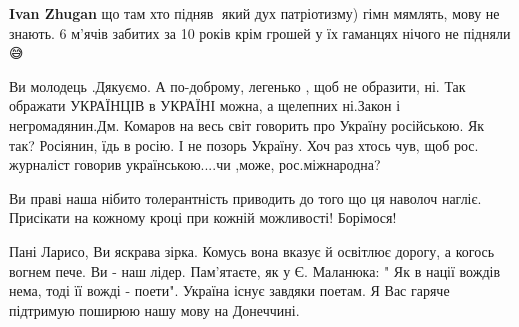 \begin{itemize}
\begin{itemize}
 
\textbf{Ivan Zhugan} що там хто підняв🤦 який дух патріотизму) гімн мямлять, мову не знають. 6 м'ячів забитих за 10 років крім грошей у їх гаманцях нічого не підняли😅
\end{itemize}

 

Ви молодець .Дякуємо. А по-доброму, легенько , щоб не образити, ні. Так
ображати УКРАЇНЦІВ в УКРАЇНІ можна, а щелепних ні.Закон і негромадянин.Дм.
Комаров на весь світ говорить про Україну російською. Як так? Росіянин, їдь в
росію. І не позорь Україну. Хоч раз хтось чув, щоб рос. журналіст говорив
українською....чи ,може, рос.міжнародна?


 

Ви праві наша нібито толерантність приводить до того що ця наволоч нагліє.
Присікати на кожному кроці при кожній можливості! Борімося!


 

Пані Ларисо, Ви яскрава зірка. Комусь вона вказує й освітлює дорогу, а когось
вогнем пече. Ви - наш лідер. Пам'ятаєте, як у Є. Маланюка: " Як в нації вождів
нема, тоді її вожді - поети". Україна існує завдяки поетам. Я Вас гаряче
підтримую поширюю нашу мову на Донеччині.

 


\end{itemize}
